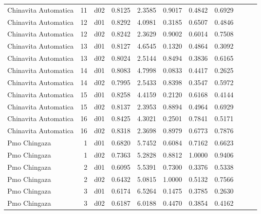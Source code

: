 \begin{landscape}
\begin{longtable}{p{2cm}rrrrrrrrrr}
    Chinavita Automatica  &         11 &     d02 &   0.8125 &  2.3585 &        0.9017 &           0.4842 &  0.6929 \\
    Chinavita Automatica  &         12 &     d01 &   0.8292 &  4.0981 &        0.3185 &           0.6507 &  0.4846 \\
    Chinavita Automatica  &         12 &     d02 &   0.8242 &  2.3629 &        0.9002 &           0.6014 &  0.7508 \\
    Chinavita Automatica  &         13 &     d01 &   0.8127 &  4.6545 &        0.1320 &           0.4864 &  0.3092 \\
    Chinavita Automatica  &         13 &     d02 &   0.8024 &  2.5144 &        0.8494 &           0.3836 &  0.6165 \\
    Chinavita Automatica  &         14 &     d01 &   0.8083 &  4.7998 &        0.0833 &           0.4417 &  0.2625 \\
    Chinavita Automatica  &         14 &     d02 &   0.7995 &  2.5433 &        0.8398 &           0.3547 &  0.5972 \\
    Chinavita Automatica  &         15 &     d01 &   0.8258 &  4.4159 &        0.2120 &           0.6168 &  0.4144 \\
    Chinavita Automatica  &         15 &     d02 &   0.8137 &  2.3953 &        0.8894 &           0.4964 &  0.6929 \\
    Chinavita Automatica  &         16 &     d01 &   0.8425 &  4.3021 &        0.2501 &           0.7841 &  0.5171 \\
    Chinavita Automatica  &         16 &     d02 &   0.8318 &  2.3698 &        0.8979 &           0.6773 &  0.7876 \\
            Pmo Chingaza  &          1 &     d01 &   0.6820 &  5.7452 &        0.6084 &           0.7162 &  0.6623 \\
            Pmo Chingaza  &          1 &     d02 &   0.7363 &  5.2828 &        0.8812 &           1.0000 &  0.9406 \\
            Pmo Chingaza  &          2 &     d01 &   0.6095 &  5.5391 &        0.7300 &           0.3376 &  0.5338 \\
            Pmo Chingaza  &          2 &     d02 &   0.6432 &  5.0815 &        1.0000 &           0.5132 &  0.7566 \\
            Pmo Chingaza  &          3 &     d01 &   0.6174 &  6.5264 &        0.1475 &           0.3785 &  0.2630 \\
            Pmo Chingaza  &          3 &     d02 &   0.6187 &  6.0188 &        0.4470 &           0.3854 &  0.4162 \\

\end{longtable}
\end{landscape}
